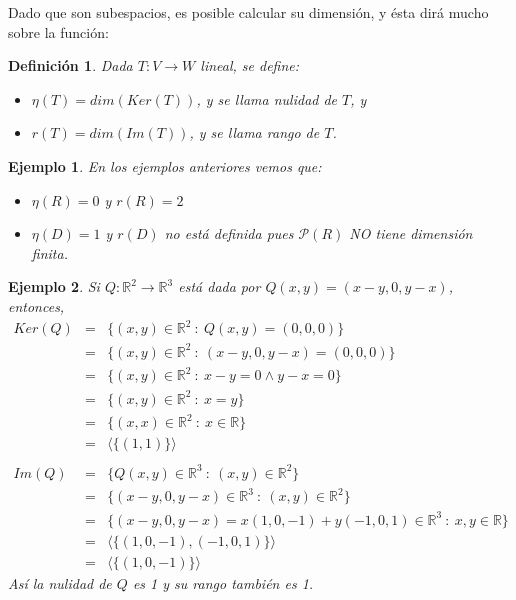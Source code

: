 \documentclass[12pt]{book}
\newtheorem{defi}{Definici\'on}
\newtheorem{ejem}{Ejemplo}
\def\R{\mathbb{R}}
\def\P{\mathcal{P}}
\begin{document}
\vspace{0.2 cm}

 Dado que son subespacios, es posible calcular su dimensión, y ésta dir\'a mucho sobre la función:

\begin{defi}
Dada $T:V\rightarrow W$ lineal, se define:

\begin{itemize}
\item $\eta(T)=dim(Ker(T))$, y se llama \emph{nulidad} de $T$, y
\item $r(T)=dim(Im(T))$, y se llama \emph{rango} de $T$.
\end{itemize}
\end{defi}

\begin{ejem}{\em 
  En los ejemplos anteriores vemos que:  
  \begin{itemize}
  \item $\eta(R)=0$ y $r(R)=2$
  \item $\eta(D)=1$ y $r(D)$ no está definida pues $\P(R)$ NO tiene dimensión finita.
  \end{itemize}
  }
  \end{ejem}



\begin{ejem} {\em
Si $Q:\R^2\rightarrow \R^3$ está dada por $Q(x,y)=(x-y,0,y-x)$, entonces, 
\begin{eqnarray*}
Ker(Q)&=&\{ (x,y)\in\R^2\ :\ Q(x,y)=(0,0,0)\}\\
&=&\{ (x,y)\in\R^2\ :\ (x-y,0,y-x)=(0,0,0)\}\\
&=&\{ (x,y)\in\R^2\ :\ x-y=0\wedge y-x=0\}\\
&=&\{ (x,y)\in\R^2\ :\ x=y\}\\
&=&\{ (x,x)\in\R^2\ :\ x\in\R\}\\
&=&\langle\{ (1,1)\}\rangle\\
\\
Im(Q)&=&\{Q(x,y)\in\R^3 \ :\ (x,y)\in\R^2\}\\
&=&\{(x-y,0,y-x)\in\R^3 \ :\ (x,y)\in\R^2\}\\
&=&\{(x-y,0,y-x)=x(1,0,-1)+y(-1,0,1)\in\R^3 \ :\ x,y\in\R\}\\
&=&\langle\{(1,0,-1),(-1,0,1)\}\rangle\\
&=&\langle\{(1,0,-1)\}\rangle
\end{eqnarray*}
Así la nulidad de $Q$ es 1 y su rango también es 1.}
\end{ejem}
\end{document}
